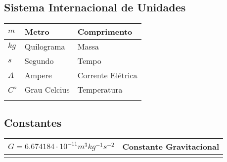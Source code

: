\subsection{Sistema Internacional de Unidades}
    \begin{center}
        \begin{longtable}{| m{3cm} | m{3cm} | m{8.57cm} |}
            \hline $ m $ & Metro & Comprimento\\
            \hline $ kg $ & Quilograma & Massa\\
            \hline $ s $ & Segundo & Tempo\\
            \hline $ A $ & Ampere & Corrente Elétrica\\
            \hline $ C^{o} $ & Grau Celcius & Temperatura\\
            \hline $  $ &  & \\
            \hline
        \end{longtable}
    \end{center}
\subsection{Constantes}
    \begin{center}
        \begin{longtable}{| m{6cm} | m{8.57cm} |}
            \hline $ G = 6.674184 \cdot 10^{-11}m^{3}kg^{-1}s^{-2} $ & Constante Gravitacional\\
            \hline $  $ & \\
            \hline
        \end{longtable}
    \end{center}